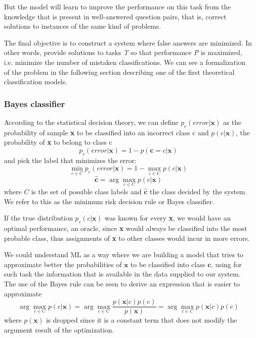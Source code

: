 \documentclass[11pt,english,listoffigures,listoftables]{tfgetsinf}
\newcommand{\vect}[1]{\mathbf{#1}}
\begin{document}
But the model will learn to improve the performance on this task from the knowledge that is present in well-answered question pairs, that is, correct solutions to instances of the same kind of problems.

The final objective is to construct a system where false answers are minimized. In other words, provide solutions to tasks \textit{T} so that performance \textit{P} is maximized, i.e. minimize the number of mistaken classifications. We can see a formalization of the problem in the following section describing one of the first theoretical classification models. 

\subsubsection{Bayes classifier}
According to the statistical decision theory, 
we can define $p_c(error | \vect{x})$ as the probability of sample \textbf{x} to be classified into an incorrect class c and $p(c | \vect{x})$, the probability of \textbf{x} to belong to class c
\begin{equation}
    p_c(error | \vect{x}) = 1 - p( \vect{c}= c | \vect{x})
\end{equation}
and pick the label that minimizes the error: 
\begin{equation}
    \min_{c \in C} p_c(error | \vect{x} ) = 1 - \max_{c \in C} p(c| \vect{x})
\end{equation}
\begin{equation}\label{cagmx}
    \vect{\hat{c}} = \arg \max_{c \in C} p(c| \vect{x})
\end{equation}
where $C$ is the set of possible class labels and $\vect{\hat{c}} $ the class decided by the system.
We refer to this as the minimum risk decision rule or Bayes classifier.

If the true distribution $p_c(c|\vect{x})$ was known for every \textbf{x}, we would have an optimal performance, an oracle, since \textbf{x} would always be classified into the most probable class, thus assignments of \textbf{x} to other classes would incur in more errors.

We could understand ML as a way where we are building a model that tries to approximate better the probabilities of $\vect{x}$ to be classified into class $\vect{c}$, using for such task the information that is available in the data supplied to our system. The use of the Bayes rule can be seen to derive an expression that is easier to approximate 
\begin{equation}\label{bayesxc}
    \arg \max_{c \in C} p(c| \vect{x}) =  \arg \max_{c \in C} \frac{p(\vect{x} | c) p(c)}{p(\vect{x})} = \arg \max_{c \in C} p(\vect{x} | c) p(c)
\end{equation}
where $p(\vect{x})$ is dropped since it is a constant term that does not modify the argument result of the optimization.
\end{document}
